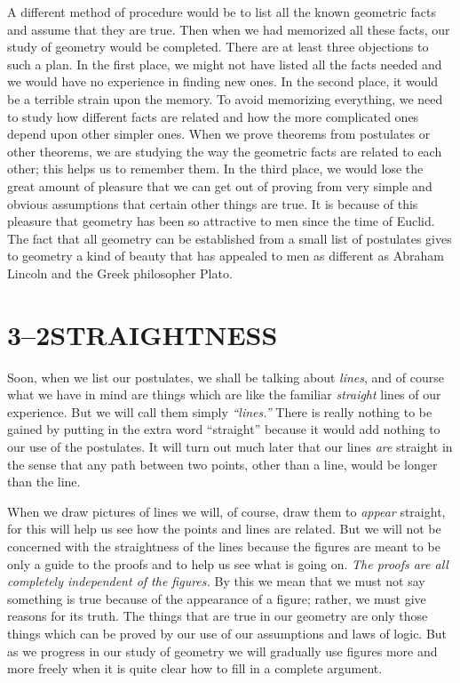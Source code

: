 \documentclass[11pt]{book}
\theoremstyle{bkplain}
\begin{document}
A different method of procedure would be to list all the known geometric facts
and assume that they are true. Then when we had memorized all these facts, our
study of geometry would be completed. There are at least three objections to
such a plan. In the first place, we might not have listed all the facts needed
and we would have no experience in finding new ones. In the second place, it
would be a terrible strain upon the memory. To avoid memorizing everything, we
need to study how different facts are related and how the more complicated ones
depend upon other simpler ones. When we prove theorems from postulates or other
theorems, we are studying the way the geometric facts are related to each other;
this helps us to remember them. In the third place, we would lose the great
amount of pleasure that we can get out of proving from very simple and obvious
assumptions that certain other things are true. It is because of this pleasure
that geometry has been so attractive to men since the time of Euclid. The fact
that all geometry can be established from a small list of postulates gives to
geometry a kind of beauty that has appealed to men as different as Abraham
Lincoln and the Greek philosopher Plato.

\section*{3--2\quad STRAIGHTNESS}

Soon, when we list our postulates, we shall be talking about \emph{lines}, and of
course what we have in mind are things which are like the familiar \emph{straight}
lines of our experience. But we will call them simply \emph{``lines.''} There is
really nothing to be gained by putting in the extra word ``straight'' because it
would add nothing to our use of the postulates. It will turn out much later that
our lines \emph{are} straight in the sense that any path between two points,
other than a line, would be longer than the line.

When we draw pictures of lines we will, of course, draw them to \emph{appear}
straight, for this will help us see how the points and lines are related. But we
will not be concerned with the straightness of the lines because the figures are
meant to be only a guide to the proofs and to help us see what is going on.
\emph{The proofs are all completely independent of the figures.} By this we mean
that we must not say something is true because of the appearance of a figure;
rather, we must give reasons for its truth. The things that are true in our
geometry are only those things which can be proved by our use of our assumptions
and laws of logic. But as we progress in our study of geometry we will gradually
use figures more and more freely when it is quite clear how to fill in a complete
argument.
\end{document}
